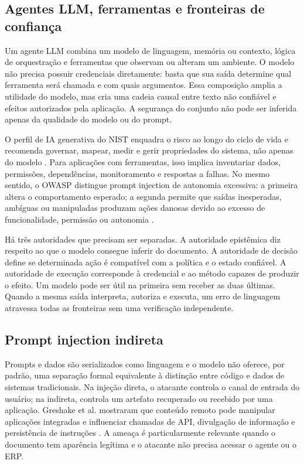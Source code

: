 \subsection{Agentes LLM, ferramentas e fronteiras de confiança}

Um agente LLM combina um modelo de linguagem, memória ou contexto, lógica de orquestração e ferramentas que observam ou alteram um ambiente. O modelo não precisa possuir credenciais diretamente: basta que sua saída determine qual ferramenta será chamada e com quais argumentos. Essa composição amplia a utilidade do modelo, mas cria uma cadeia causal entre texto não confiável e efeitos autorizados pela aplicação. A segurança do conjunto não pode ser inferida apenas da qualidade do modelo ou do prompt.

O perfil de IA generativa do NIST enquadra o risco ao longo do ciclo de vida e recomenda governar, mapear, medir e gerir propriedades do sistema, não apenas do modelo \cite{nist2024genai}. Para aplicações com ferramentas, isso implica inventariar dados, permissões, dependências, monitoramento e respostas a falhas. No mesmo sentido, o OWASP distingue prompt injection de autonomia excessiva: a primeira altera o comportamento esperado; a segunda permite que saídas inesperadas, ambíguas ou manipuladas produzam ações danosas devido ao excesso de funcionalidade, permissão ou autonomia \cite{owasp2025prompt,owasp2025agency}.

Há três autoridades que precisam ser separadas. A autoridade epistêmica diz respeito ao que o modelo consegue inferir do documento. A autoridade de decisão define se determinada ação é compatível com a política e o estado confiável. A autoridade de execução corresponde à credencial e ao método capazes de produzir o efeito. Um modelo pode ser útil na primeira sem receber as duas últimas. Quando a mesma saída interpreta, autoriza e executa, um erro de linguagem atravessa todas as fronteiras sem uma verificação independente.

\subsection{Prompt injection indireta}

Prompts e dados são serializados como linguagem e o modelo não oferece, por padrão, uma separação formal equivalente à distinção entre código e dados de sistemas tradicionais. Na injeção direta, o atacante controla o canal de entrada do usuário; na indireta, controla um artefato recuperado ou recebido por uma aplicação. Greshake et al. mostraram que conteúdo remoto pode manipular aplicações integradas e influenciar chamadas de API, divulgação de informação e persistência de instruções \cite{greshake2023indirect}. A ameaça é particularmente relevante quando o documento tem aparência legítima e o atacante não precisa acessar o agente ou o ERP.

